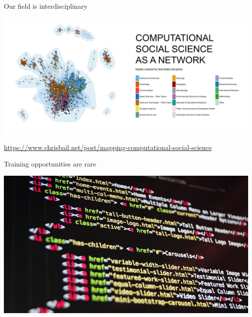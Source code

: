 \documentclass{beamer}
\def\vf{\vfill}
\begin{document}
\begin{frame}{Our field is interdisciplinary}

\begin{center}
\includegraphics[width=1.0\textwidth]{figures/colore_by_nodes_arial.png}
\end{center}


\vf
\tiny{\url{https://www.chrisbail.net/post/mapping-computational-social-science}}

\end{frame}

\begin{frame}{Training opportunities are rare}

\begin{center}
\includegraphics[width=1.0\textwidth]{figures/code.jpg}
\end{center}

\end{frame}
\end{document}
